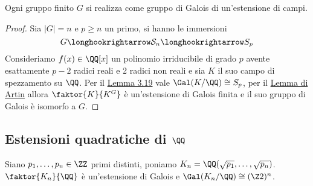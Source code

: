 \documentclass[11pt]{scrartcl}
\begin{document}
	\begin{proposition}
		Ogni gruppo finito $G$ si realizza come gruppo di Galois di un'estensione
		di campi.
	\end{proposition}
	
	\begin{proof}
		Sia $|G| = n$ e $p \geq n$ un primo, si hanno le immersioni
		\[
		G \longhookrightarrow \mathcal{S}_n \longhookrightarrow S_p
		\]
		Consideriamo $f(x) \in \QQ[x]$ un polinomio irriducibile di grado $p$
		avente esattamente $p - 2$ radici reali e 2 radici non reali e sia $K$ 
		il suo campo di spezzamento su $\QQ$. Per il \hyperref[lemma3.19]{Lemma 3.19}
		vale $\Gal(K/\QQ) \cong S_p$, per il \hyperref[lemma3.20]{Lemma di Artin}
		allora $\faktor{K}{K^G}$ è un'estensione di Galois finita e il suo gruppo
		di Galois è isomorfo a $G$.
	\end{proof}
	
	\newpage
	
	\subsection{Estensioni quadratiche di $\QQ$}
	
	\begin{theorem}
		Siano $p_1, \ldots, p_n \in \ZZ$ primi distinti, poniamo $K_n = 
		\QQ(\sqrt{p_1}, \ldots, \sqrt{p_n})$. $\faktor{K_n}{\QQ}$ è un'estensione
		di Galois e $\Gal(K_n/\QQ) \cong (\Z2)^n$.
	\end{theorem}
	
\end{document}
